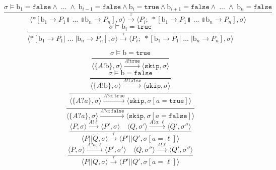 \documentclass[compress]{beamer}
\begin{document}
\begin{frame}
$$    %
        \frac{\sigma \models \mathrm{b}_1 = \mathtt{false} \wedge \; \ldots \; \wedge \; \mathrm{b}_{i-1} = \mathtt{false} \wedge \mathrm{b}_i = \mathtt{true} \wedge \mathrm{b}_{i+1} = \mathtt{false} \wedge \; \ldots \; \wedge \; \mathrm{b}_n = \mathtt{false}} {\langle *[ \mathrm{b}_1 \rightarrow P_1  \talloblong \; \ldots \; \talloblong \mathrm{b}_n \rightarrow P_n ] , \sigma \rangle \xrightarrow{\tau} \langle P_i; \; *[ \mathrm{b}_1 \rightarrow P_1  \talloblong \; \ldots \; \talloblong \mathrm{b}_n \rightarrow P_n ] , \sigma\rangle  } $$$$
        \frac{\sigma \models \mathrm{b}_i = \mathtt{true}} {\langle *[ \mathrm{b}_1 \rightarrow P_1  | \; \ldots \; | \mathrm{b}_n \rightarrow P_n ] , \sigma \rangle \xrightarrow{\tau} \langle P_i;\;*[ \mathrm{b}_1 \rightarrow P_1  | \; \ldots \; | \mathrm{b}_n \rightarrow P_n ] , \sigma\rangle  }
    $$
\end{frame}
\begin{frame}
    \small
    $$
        \frac{\sigma \models \mathrm{b} = \mathtt{true}}{\langle \{A!\mathrm{b}\}, \sigma \rangle \xrightarrow{A!\mathtt{true}} \langle \mathtt{skip}, \sigma \rangle} $$$$
        \frac{\sigma \models \mathrm{b} = \mathtt{false}}{\langle \{A!\mathrm{b}\}, \sigma \rangle \xrightarrow{A!\mathtt{false}} \langle \mathtt{skip}, \sigma \rangle} $$$$
        \frac{}{\langle \{A?a\}, \sigma \rangle \xrightarrow{A?a : \mathtt{true}} \langle \mathtt{skip}, \sigma[a = \mathtt{true}] \rangle} $$$$
        \frac{}{\langle \{A?a\}, \sigma \rangle \xrightarrow{A?a : \mathtt{false}} \langle \mathtt{skip}, \sigma[a = \mathtt{false}] \rangle} $$$$
        \frac{\langle P, \sigma \rangle \xrightarrow{A!\ell} \langle P', \sigma \rangle \quad \langle Q, \sigma' \rangle \xrightarrow{A?a : \ell} \langle Q', \sigma'' \rangle}{\langle P || Q, \sigma \rangle \xrightarrow{\tau} \langle P' || Q', \sigma[a = \ell] \rangle} $$$$
        \frac{\langle P, \sigma \rangle \xrightarrow{A?a : \ell} \langle P', \sigma' \rangle \quad \langle Q, \sigma'' \rangle \xrightarrow{A!\ell} \langle Q', \sigma'' \rangle}{\langle P || Q, \sigma \rangle \xrightarrow{\tau} \langle P' || Q', \sigma[a = \ell] \rangle}
    $$
\end{frame}
\end{document}
